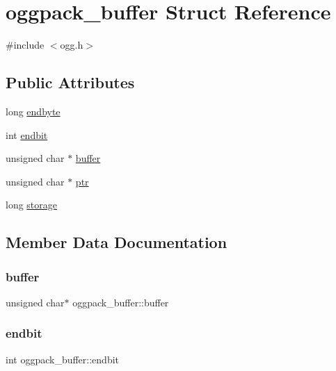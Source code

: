 \hypertarget{structoggpack__buffer}{}\section{oggpack\+\_\+buffer Struct Reference}
\label{structoggpack__buffer}


{\ttfamily \#include $<$ogg.\+h$>$}

\subsection*{Public Attributes}
\begin{DoxyCompactItemize}
\item 
long \hyperlink{structoggpack__buffer_a416200dd77da3603dce3913826d74207}{endbyte}
\item 
int \hyperlink{structoggpack__buffer_a5a2ecb260025f73201e58dbd621c9f8b}{endbit}
\item 
unsigned char $\ast$ \hyperlink{structoggpack__buffer_a2d828a6e3d0a57f44debf56665ad402e}{buffer}
\item 
unsigned char $\ast$ \hyperlink{structoggpack__buffer_a479984d9646e0fba6da8aff21e5c3b64}{ptr}
\item 
long \hyperlink{structoggpack__buffer_a1eea2afb662c8080a902d224773fee4e}{storage}
\end{DoxyCompactItemize}


\subsection{Member Data Documentation}
\mbox{\label{structoggpack__buffer_a2d828a6e3d0a57f44debf56665ad402e}} 
\subsubsection{\texorpdfstring{buffer}{buffer}}
{\footnotesize\ttfamily unsigned char$\ast$ oggpack\+\_\+buffer\+::buffer}

\mbox{\label{structoggpack__buffer_a5a2ecb260025f73201e58dbd621c9f8b}} 
\subsubsection{\texorpdfstring{endbit}{endbit}}
{\footnotesize\ttfamily int oggpack\+\_\+buffer\+::endbit}

